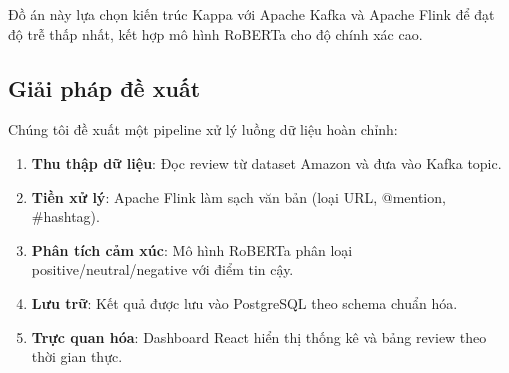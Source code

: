 Đồ án này lựa chọn kiến trúc Kappa với Apache Kafka và Apache Flink để đạt độ trễ thấp nhất, kết hợp mô hình RoBERTa cho độ chính xác cao.

\subsection{Giải pháp đề xuất}

Chúng tôi đề xuất một pipeline xử lý luồng dữ liệu hoàn chỉnh:

\begin{enumerate}
    \item \textbf{Thu thập dữ liệu}: Đọc review từ dataset Amazon và đưa vào Kafka topic.
    \item \textbf{Tiền xử lý}: Apache Flink làm sạch văn bản (loại URL, @mention, \#hashtag).
    \item \textbf{Phân tích cảm xúc}: Mô hình RoBERTa phân loại positive/neutral/negative với điểm tin cậy.
    \item \textbf{Lưu trữ}: Kết quả được lưu vào PostgreSQL theo schema chuẩn hóa.
    \item \textbf{Trực quan hóa}: Dashboard React hiển thị thống kê và bảng review theo thời gian thực.
\end{enumerate}
